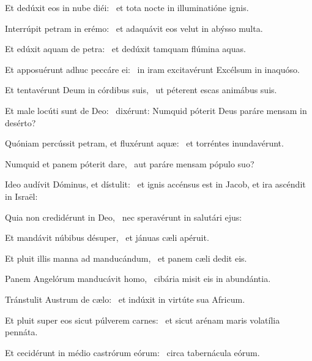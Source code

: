 \item Et dedúxit eos in nube diéi:~\psstar{} et tota nocte in illuminatióne ignis.

\item Interrúpit petram in erémo:~\psstar{} et adaquávit eos velut in abýsso multa.

\item Et edúxit aquam de petra:~\psstar{} et dedúxit tamquam flúmina aquas.

\item Et apposuérunt adhuc peccáre ei:~\psstar{} in iram excitavérunt Excélsum in inaquóso.

\item Et tentavérunt Deum in córdibus suis,~\psstar{} ut péterent escas animábus suis.

\item Et male locúti sunt de Deo:~\psstar{} dixérunt: Numquid póterit Deus paráre mensam in desérto?

\item Quóniam percússit petram, et fluxérunt aquæ:~\psstar{} et torréntes inundavérunt.

\item Numquid et panem póterit dare,~\psstar{} aut paráre mensam pópulo suo?

\item Ideo audívit Dóminus, et dístulit:~\psstar{} et ignis accénsus est in Jacob, et ira ascéndit in Israël:

\item Quia non credidérunt in Deo,~\psstar{} nec speravérunt in salutári ejus:

\item Et mandávit núbibus désuper,~\psstar{} et jánuas cæli apéruit.

\item Et pluit illis manna ad manducándum,~\psstar{} et panem cæli dedit eis.

\item Panem Angelórum manducávit homo,~\psstar{} cibária misit eis in abundántia.

\item Tránstulit Austrum de cælo:~\psstar{} et indúxit in virtúte sua Africum.

\item Et pluit super eos sicut púlverem carnes:~\psstar{} et sicut arénam maris volatília pennáta.

\item Et cecidérunt in médio castrórum eórum:~\psstar{} circa tabernácula eórum.


